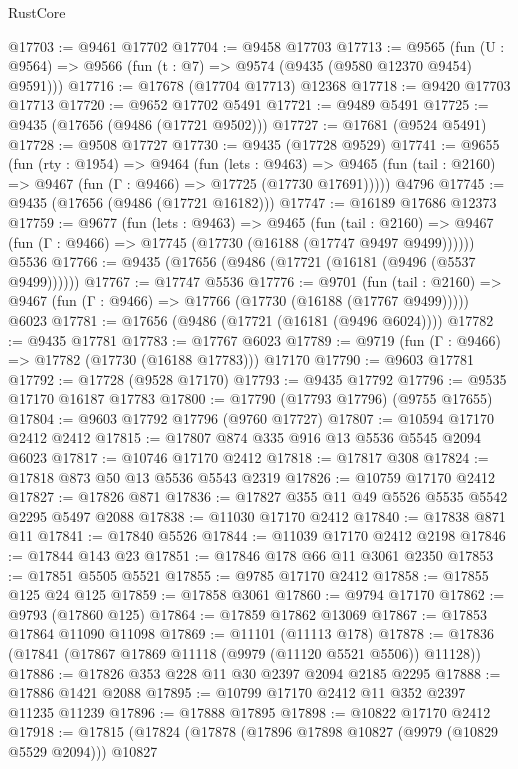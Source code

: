 \begin{lexlean}{RustCore}
\begin{coremodule}
@17703 := @9461 @17702
@17704 := @9458 @17703
@17713 := @9565
    (fun (U : @9564) => @9566 (fun (t : @7) => @9574 (@9435 (@9580 @12370 @9454) @9591)))
@17716 := @17678 (@17704 @17713) @12368
@17718 := @9420 @17703 @17713
@17720 := @9652 @17702 @5491
@17721 := @9489 @5491
@17725 := @9435 (@17656 (@9486 (@17721 @9502)))
@17727 := @17681 (@9524 @5491)
@17728 := @9508 @17727
@17730 := @9435 (@17728 @9529)
@17741 := @9655
    (fun (rty : @1954) =>
    @9464
      (fun (lets : @9463) =>
      @9465 (fun (tail : @2160) => @9467 (fun (Γ : @9466) => @17725 (@17730 @17691)))))
    @4796
@17745 := @9435 (@17656 (@9486 (@17721 @16182)))
@17747 := @16189 @17686 @12373
@17759 := @9677
    (fun (lets : @9463) =>
    @9465
      (fun (tail : @2160) =>
      @9467 (fun (Γ : @9466) => @17745 (@17730 (@16188 (@17747 @9497 @9499))))))
    @5536
@17766 := @9435 (@17656 (@9486 (@17721 (@16181 (@9496 (@5537 @9499))))))
@17767 := @17747 @5536
@17776 := @9701
    (fun (tail : @2160) => @9467 (fun (Γ : @9466) => @17766 (@17730 (@16188 (@17767 @9499)))))
    @6023
@17781 := @17656 (@9486 (@17721 (@16181 (@9496 @6024))))
@17782 := @9435 @17781
@17783 := @17767 @6023
@17789 := @9719 (fun (Γ : @9466) => @17782 (@17730 (@16188 @17783))) @17170
@17790 := @9603 @17781
@17792 := @17728 (@9528 @17170)
@17793 := @9435 @17792
@17796 := @9535 @17170 @16187 @17783
@17800 := @17790 (@17793 @17796) (@9755 @17655)
@17804 := @9603 @17792 @17796 (@9760 @17727)
@17807 := @10594 @17170 @2412 @2412
@17815 := @17807 @874 @335 @916 @13 @5536 @5545 @2094 @6023
@17817 := @10746 @17170 @2412
@17818 := @17817 @308
@17824 := @17818 @873 @50 @13 @5536 @5543 @2319
@17826 := @10759 @17170 @2412
@17827 := @17826 @871
@17836 := @17827 @355 @11 @49 @5526 @5535 @5542 @2295 @5497 @2088
@17838 := @11030 @17170 @2412
@17840 := @17838 @871 @11
@17841 := @17840 @5526
@17844 := @11039 @17170 @2412 @2198
@17846 := @17844 @143 @23
@17851 := @17846 @178 @66 @11 @3061 @2350
@17853 := @17851 @5505 @5521
@17855 := @9785 @17170 @2412
@17858 := @17855 @125 @24 @125
@17859 := @17858 @3061
@17860 := @9794 @17170
@17862 := @9793 (@17860 @125)
@17864 := @17859 @17862 @13069
@17867 := @17853 @17864 @11090 @11098
@17869 := @11101 (@11113 @178)
@17878 := @17836 (@17841 (@17867 @17869 @11118 (@9979 (@11120 @5521 @5506)) @11128))
@17886 := @17826 @353 @228 @11 @30 @2397 @2094 @2185 @2295
@17888 := @17886 @1421 @2088
@17895 := @10799 @17170 @2412 @11 @352 @2397 @11235 @11239
@17896 := @17888 @17895
@17898 := @10822 @17170 @2412
@17918 := @17815
    (@17824
      (@17878
        (@17896 @17898 @10827 (@9979 (@10829 @5529 @2094)))
        @10827

\end{coremodule}
\end{lexlean}
